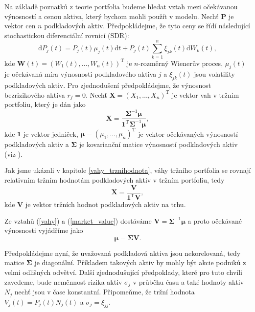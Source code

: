 \documentclass[a4paper,12pt]{report}
\theoremstyle{definition} \newtheorem{definice}[veta]{Definice}
\theoremstyle{remark}
\begin{document}
Na základě poznatků z teorie portfolia budeme hledat vztah mezi oče\-ká\-vanou výnosností a cenou aktiva, který bychom mohli použít v modelu.
Nechť $\boldsymbol{P}$ je vektor cen $n$ podkladových aktiv.
Předpokládejme, že tyto ceny se řídí následující stochastickou diferenciální rovnicí (SDR):
\begin{equation} \label{SDE}
\mathrm{d}P_j(t)=P_j(t)\mu_j(t)\mathrm{d}t+P_j(t)\sum_{k=1}^{n}\xi_{jk}(t)\mathrm{d}W_k(t),
\end{equation}
kde $\boldsymbol{W}(t)=(W_1(t),\dots,W_n(t))^\mathrm{T}$ je $n$-rozměrný Wienerův proces, $\mu_j(t)$ je očekávaná míra výnosnosti podkladového aktiva $j$ a $\xi_{jk}(t)$ jsou volatility podkladových aktiv. 
Pro zjednodušení předpokládejme, že výnosnost bezrizikového aktiva $r_f=0$.
Nechť $\boldsymbol{X}=(X_1,\dots,X_n)^\mathrm{T}$ je vektor vah v tržním portfoliu, který je dán jako
\begin{equation} \label{vahy}
\boldsymbol{X}=\frac{\boldsymbol{\Sigma}^{-1}\boldsymbol{\mu}}{\boldsymbol{1}^\mathrm{T}\boldsymbol{\Sigma}^{-1}\boldsymbol{\mu}},
\end{equation}
kde $\boldsymbol{1}$ je vektor jedniček, $\boldsymbol{\mu}=(\mu_1,\dots,\mu_n)^\mathrm{T}$ je vektor očekávaných výnosností podkladových aktiv a $\boldsymbol{\Sigma}$ je kovarianční matice výnosností podkladových aktiv (viz \cite{fabozzi}).

Jak jsme ukázali v kapitole \ref{vahy_trznihodnota}, váhy tržního portfolia se rovnají relativním tržním hodnotám podkladových aktiv v tržním portfoliu, tedy
\begin{equation} \label{market_value}
\boldsymbol{X}=\frac{\boldsymbol{V}}{\boldsymbol{1}^\mathrm{T}\boldsymbol{V}},
\end{equation}
kde $\boldsymbol{V}$ je vektor tržních hodnot podkladových aktiv na trhu.

Ze vztahů (\ref{vahy}) a (\ref{market_value}) dostáváme $\boldsymbol{V}=\boldsymbol{\Sigma}^{-1}\boldsymbol{\mu}$ a proto očekávané výnos\-nosti vyjádříme jako
\begin{equation} \label{mu}
\boldsymbol{\mu}=\boldsymbol{\Sigma}\boldsymbol{V}.
\end{equation}

Předpokládejme nyní, že uvažovaná podkladová aktiva jsou nekorelovaná, tedy matice $\boldsymbol{\Sigma}$ je diagonální.
Příkladem takových aktiv by mohly být akcie podniků z velmi odlišných odvětví.
Další zjednodušující předpoklady, které pro tuto chvíli zavedeme, bude neměnnost rizika aktiv $\sigma_j$ v průběhu času a také hodnoty aktiv $N_j$ nechť jsou v čase konstantní.
Připomeňme, že tržní hodnota  $V_j(t)=P_j(t)N_j(t)$ a $\sigma_{j}=\xi_{jj}$.
\end{document}
